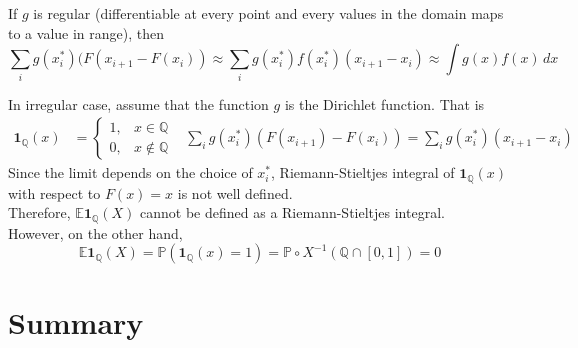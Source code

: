 \documentclass{huhtakm-template-book}
\newcommand{\prob}{\mathbb{P}}
\newcommand{\expect}{\mathbb{E}}
\begin{document}
\begin{eg}
	If $g$ is regular (differentiable at every point and every values in the domain maps to a value in range), then
	\begin{equation*}
		\sum_{i}g(x_{i}^{*})(F(x_{i+1}-F(x_{i}))\approx\sum_{i}g(x_{i}^{*})f(x_{i}^{*})(x_{i+1}-x_{i})\approx\int g(x)f(x)\,dx
	\end{equation*}
\end{eg}
\begin{eg}
	In irregular case, assume that the function $g$ is the Dirichlet function. That is
	\begin{align*}
		\mathbf{1}_{\mathbb{Q}}(x)&=\begin{cases}
			1, &x\in\mathbb{Q}\\
			0, &x\not\in\mathbb{Q}
		\end{cases} & \sum_{i}g(x_{i}^{*})(F(x_{i+1})-F(x_{i}))=\sum_{i}g(x_{i}^{*})(x_{i+1}-x_{i})
	\end{align*}
	Since the limit depends on the choice of $x_{i}^{*}$, Riemann-Stieltjes integral of $\mathbf{1}_{\mathbb{Q}}(x)$ with respect to $F(x)=x$ is not well defined.\\
	Therefore, $\expect\mathbf{1}_{\mathbb{Q}}(X)$ cannot be defined as a Riemann-Stieltjes integral.\\
	However, on the other hand,
	\begin{equation*}
		\expect\mathbf{1}_{\mathbb{Q}}(X)=\prob(\mathbf{1}_{\mathbb{Q}}(x)=1)=\prob\circ X^{-1}(\mathbb{Q}\cap[0,1])=0
	\end{equation*}
\end{eg}

\chapter*{Summary}
\end{document}
